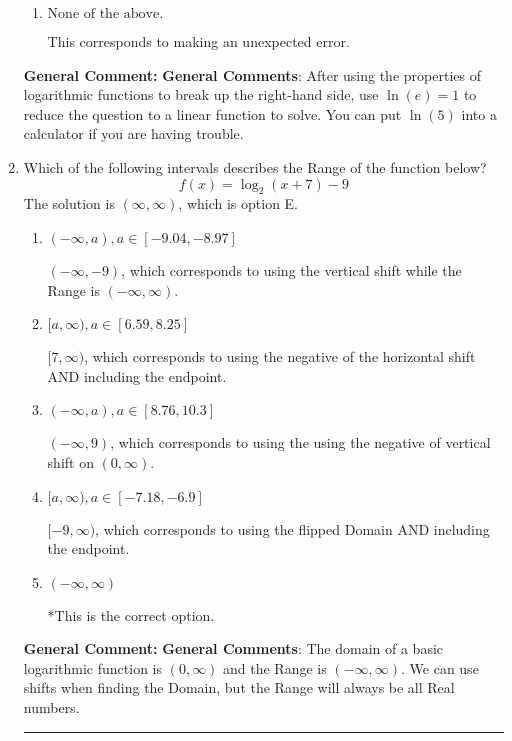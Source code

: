 \documentclass{extbook}[14pt]
\newcommand{\litem}[1]{\item #1

\rule{\textwidth}{0.4pt}}
\begin{document}
\begin{enumerate}
{\begin{enumerate}[label=\Alph*.]
This corresponds to believing you cannot solve the equation.
\item \( \text{None of the above.} \)

This corresponds to making an unexpected error.
\end{enumerate}

\textbf{General Comment:} \textbf{General Comments}: After using the properties of logarithmic functions to break up the right-hand side, use $\ln(e) = 1$ to reduce the question to a linear function to solve. You can put $\ln(5)$ into a calculator if you are having trouble.
}
\litem{
Which of the following intervals describes the Range of the function below?
\[ f(x) = \log_2{(x+7)}-9 \]The solution is \( (\infty, \infty) \), which is option E.\begin{enumerate}[label=\Alph*.]
\item \( (-\infty, a), a \in [-9.04, -8.97] \)

$(-\infty, -9)$, which corresponds to using the vertical shift while the Range is $(-\infty, \infty)$.
\item \( [a, \infty), a \in [6.59, 8.25] \)

$[7, \infty)$, which corresponds to using the negative of the horizontal shift AND including the endpoint.
\item \( (-\infty, a), a \in [8.76, 10.3] \)

$(-\infty, 9)$, which corresponds to using the using the negative of vertical shift on $(0, \infty)$.
\item \( [a, \infty), a \in [-7.18, -6.9] \)

$[-9, \infty)$, which corresponds to using the flipped Domain AND including the endpoint.
\item \( (-\infty, \infty) \)

*This is the correct option.
\end{enumerate}

\textbf{General Comment:} \textbf{General Comments}: The domain of a basic logarithmic function is $(0, \infty)$ and the Range is $(-\infty, \infty)$. We can use shifts when finding the Domain, but the Range will always be all Real numbers.
}
\end{enumerate}
\end{document}
